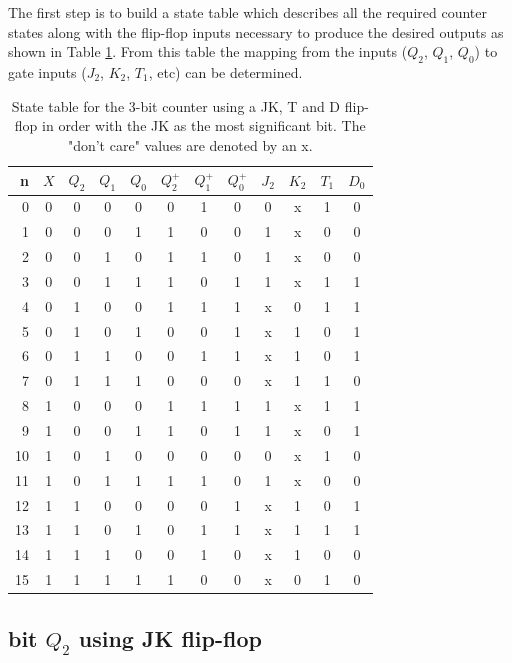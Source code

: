 \documentclass[12pt]{article}
\begin{document}
The first step is to build a state table which describes all
the required counter states along with the flip-flop inputs
necessary to produce the desired outputs as shown in Table \ref{tbl:st}. 
From this table the mapping from the inputs
($Q_2$, $Q_1$, $Q_0$) to gate inputs ($J_2$, $K_2$, $T_1$, etc) can be determined.

\begin{table}
\center
\begin{tabular}[t]{r|cccc|ccc|cc|c|c}
n & $X$ & $Q_2$ & $Q_1$ & $Q_0$ & $Q_2^+$ & $Q_1^+$ & $Q_0^+$ & $J_2$ & $K_2$ & $T_1$ & $D_0$ \\ 
\hline
0 & 0 & 0 & 0 & 0   & 0 & 1 & 0   & 0 & x   & 1   & 0 \\ 
1 & 0 & 0 & 0 & 1   & 1 & 0 & 0   & 1 & x   & 0   & 0 \\ 
2 & 0 & 0 & 1 & 0   & 1 & 1 & 0   & 1 & x   & 0   & 0 \\ 
3 & 0 & 0 & 1 & 1   & 1 & 0 & 1   & 1 & x   & 1   & 1 \\ 
4 & 0 & 1 & 0 & 0   & 1 & 1 & 1   & x & 0   & 1   & 1 \\ 
5 & 0 & 1 & 0 & 1   & 0 & 0 & 1   & x & 1   & 0   & 1 \\ 
6 & 0 & 1 & 1 & 0   & 0 & 1 & 1   & x & 1   & 0   & 1 \\ 
7 & 0 & 1 & 1 & 1   & 0 & 0 & 0   & x & 1   & 1   & 0 \\ 
8 & 1 & 0 & 0 & 0   & 1 & 1 & 1   & 1 & x   & 1   & 1 \\ 
9 & 1 & 0 & 0 & 1   & 1 & 0 & 1   & 1 & x   & 0   & 1 \\ 
10 & 1 & 0 & 1 & 0   & 0 & 0 & 0   & 0 & x   & 1   & 0 \\ 
11 & 1 & 0 & 1 & 1   & 1 & 1 & 0   & 1 & x   & 0   & 0 \\ 
12 & 1 & 1 & 0 & 0   & 0 & 0 & 1   & x & 1   & 0   & 1 \\ 
13 & 1 & 1 & 0 & 1   & 0 & 1 & 1   & x & 1   & 1   & 1 \\ 
14 & 1 & 1 & 1 & 0   & 0 & 1 & 0   & x & 1   & 0   & 0 \\ 
15 & 1 & 1 & 1 & 1   & 1 & 0 & 0   & x & 0   & 1   & 0 \\ 
\end{tabular}
\caption{State table for  the 3-bit counter using a JK,
T and D flip-flop in order with the JK as the most significant bit.
The "don't care" values are denoted by an x.}
\label{tbl:st}
\end{table}

\subsection{bit $Q_2$ using JK flip-flop}
\end{document}
